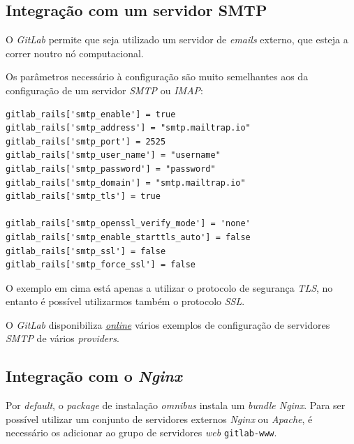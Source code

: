 \documentclass[12pt,a4paper]{article}
\begin{document}
\subsection{Integração com um servidor SMTP}

O \emph{GitLab} permite que seja utilizado um servidor de \emph{emails} externo, que esteja a correr noutro nó computacional.

Os parâmetros necessário à configuração são muito semelhantes aos da configuração de um servidor \emph{SMTP} ou \emph{IMAP}:

\begin{verbatim}
gitlab_rails['smtp_enable'] = true
gitlab_rails['smtp_address'] = "smtp.mailtrap.io"
gitlab_rails['smtp_port'] = 2525
gitlab_rails['smtp_user_name'] = "username"
gitlab_rails['smtp_password'] = "password"
gitlab_rails['smtp_domain'] = "smtp.mailtrap.io"
gitlab_rails['smtp_tls'] = true

gitlab_rails['smtp_openssl_verify_mode'] = 'none'
gitlab_rails['smtp_enable_starttls_auto'] = false
gitlab_rails['smtp_ssl'] = false
gitlab_rails['smtp_force_ssl'] = false
\end{verbatim}

O exemplo em cima está apenas a utilizar o protocolo de segurança \emph{TLS}, no entanto é possível utilizarmos também o protocolo \emph{SSL}.

O \emph{GitLab} disponibiliza \href{https://docs.gitlab.com/omnibus/settings/smtp.html#smtp-settings}{\emph{online}} vários exemplos de configuração de servidores \emph{SMTP} de vários \emph{providers}.


\subsection{Integração com o \emph{Nginx}}

Por \emph{default}, o \emph{package} de instalação \emph{omnibus} instala um \emph{bundle Nginx}. Para ser possível utilizar um conjunto de servidores externos \emph{Nginx} ou \emph{Apache}, é necessário os adicionar ao grupo de servidores \emph{web} \texttt{gitlab-www}.
\end{document}
